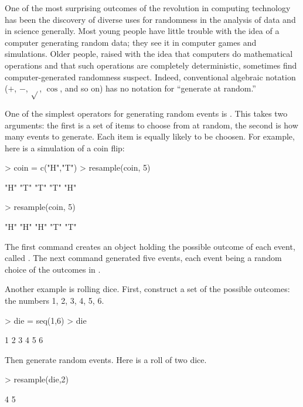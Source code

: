  


One of the most surprising outcomes of the revolution in computing
technology has been the discovery of diverse uses for randomness 
in the analysis of data and in science generally.  Most young people
have little trouble with the idea of a computer generating random data;
they see it in computer games and simulations.  Older people,
raised with the idea that computers do mathematical operations and
that such operations are completely deterministic, sometimes find 
computer-generated randomness suspect.  Indeed, conventional algebraic
notation ($+$, $-$, $\sqrt{}$, $\cos$, and so on) has no
notation for ``generate at random.''

One of the simplest operators for generating random events is
.  This takes two arguments: the first is a set of
items to choose from at random, the second is how many events
to generate.  Each item is equally likely to be
choosen.  For example, here is a simulation of a coin flip:
\begin{Schunk}
\begin{Sinput}
> coin = c("H","T")
> resample(coin, 5)
\end{Sinput}
\begin{Soutput}
[1] "H" "T" "T" "T" "H"
\end{Soutput}
\begin{Sinput}
> resample(coin, 5)
\end{Sinput}
\begin{Soutput}
[1] "H" "H" "H" "T" "T"
\end{Soutput}
\end{Schunk}
The first command creates an object holding the possible outcome of
each event, called .  The next command generated five
events, each event being a random choice of the outcomes in
.

Another example is rolling dice.  First, construct a set of the
possible outcomes: the numbers 1, 2, 3, 4, 5, 6.
\begin{Schunk}
\begin{Sinput}
> die = seq(1,6)
> die
\end{Sinput}
\begin{Soutput}
[1] 1 2 3 4 5 6
\end{Soutput}
\end{Schunk}
Then generate random events.  Here is a roll of two dice.
\begin{Schunk}
\begin{Sinput}
> resample(die,2)
\end{Sinput}
\begin{Soutput}
[1] 4 5
\end{Soutput}
\end{Schunk}

